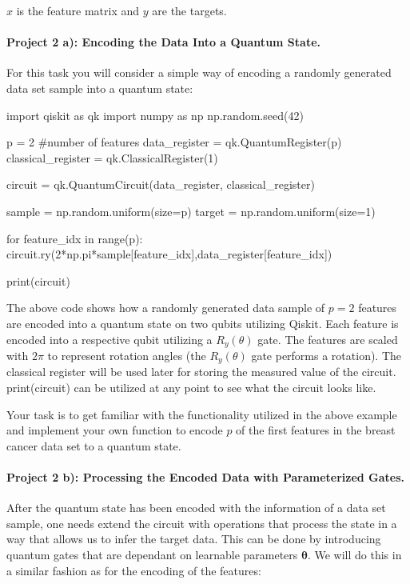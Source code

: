 \documentclass[%
oneside,                 %
final,                   %
10pt]{article}
\begin{document}
\epycod
$x$ is the feature matrix and $y$ are the targets.

\paragraph{Project 2 a): Encoding the Data Into a Quantum State.}
For this task you will consider a simple way of encoding a randomly generated data set sample into a quantum state:

\bpycod
import qiskit as qk
import numpy as np
np.random.seed(42)

p = 2 #number of features
data_register = qk.QuantumRegister(p)
classical_register = qk.ClassicalRegister(1)

circuit = qk.QuantumCircuit(data_register, classical_register) 

sample = np.random.uniform(size=p)
target = np.random.uniform(size=1)

for feature_idx in range(p):
    circuit.ry(2*np.pi*sample[feature_idx],data_register[feature_idx])

print(circuit)
\epycod

The above code shows how a randomly generated data sample of $p=2$
features are encoded into a quantum state on two qubits utilizing
Qiskit. Each feature is encoded into a respective qubit utilizing a
$R_y(\theta)$ gate. The features are scaled with $2\pi$ to represent
rotation angles (the $R_y(\theta)$ gate performs a rotation). The
classical register will be used later for storing the measured value
of the circuit.  print(circuit) can be utilized at any point to see
what the circuit looks like.



Your task is to get familiar with the functionality utilized in the
above example and implement your own function to encode $p$ of the
first features in the breast cancer data set to a quantum state.


\paragraph{Project 2 b): Processing the Encoded Data with Parameterized Gates.}
After the quantum state has been encoded with the information of a data set sample, one needs extend the circuit with operations that process the state in a way that allows us to infer the target data. This can be done by introducing quantum gates that are dependant on learnable parameters $\boldsymbol{\theta}$. We will do this in a similar fashion as for the encoding of the features:
\end{document}
